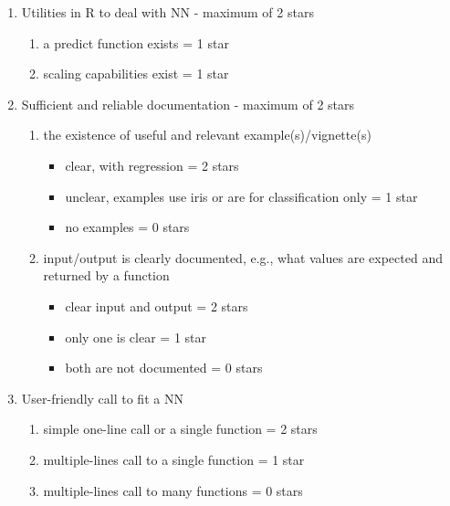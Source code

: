 \begin{enumerate}
\def\labelenumi{\arabic{enumi}.}
\tightlist
\item
  Utilities in R to deal with NN - maximum of 2 stars

  \begin{enumerate}
  \def\labelenumii{\alph{enumii}.}
  \tightlist
  \item
    a predict function exists = 1 star
  \item
    scaling capabilities exist = 1 star
  \end{enumerate}
\item
  Sufficient and reliable documentation - maximum of 2 stars

  \begin{enumerate}
  \def\labelenumii{\alph{enumii}.}
  \tightlist
  \item
    the existence of useful and relevant example(s)/vignette(s)

    \begin{itemize}
    \tightlist
    \item
      clear, with regression = 2 stars
    \item
      unclear, examples use iris or are for classification only = 1 star
    \item
      no examples = 0 stars
    \end{itemize}
  \item
    input/output is clearly documented, e.g., what values are expected
    and returned by a function

    \begin{itemize}
    \tightlist
    \item
      clear input and output = 2 stars
    \item
      only one is clear = 1 star
    \item
      both are not documented = 0 stars
    \end{itemize}
  \end{enumerate}
\item
  User-friendly call to fit a NN

  \begin{enumerate}
  \def\labelenumii{\alph{enumii}.}
  \tightlist
  \item
    simple one-line call or a single function = 2 stars
  \item
    multiple-lines call to a single function = 1 star
  \item
    multiple-lines call to many functions = 0 stars
  \end{enumerate}
\end{enumerate}

